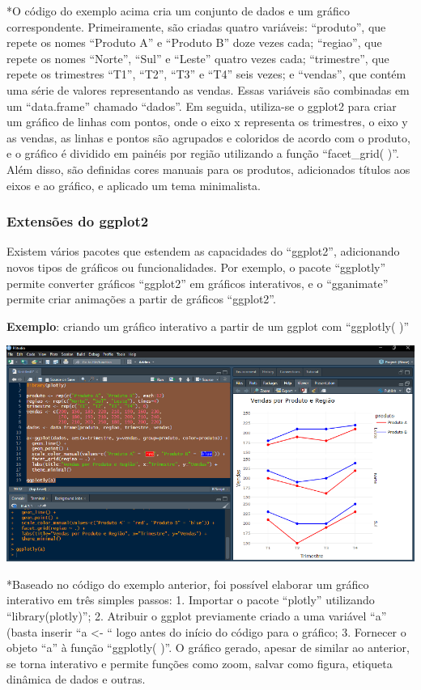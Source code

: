 \documentclass[
]{book}
\begin{document}
*O código do exemplo acima cria um conjunto de dados e um gráfico correspondente. Primeiramente, são criadas quatro variáveis: ``produto'', que repete os nomes ``Produto A'' e ``Produto B'' doze vezes cada; ``regiao'', que repete os nomes ``Norte'', ``Sul'' e ``Leste'' quatro vezes cada; ``trimestre'', que repete os trimestres ``T1'', ``T2'', ``T3'' e ``T4'' seis vezes; e ``vendas'', que contém uma série de valores representando as vendas. Essas variáveis são combinadas em um ``data.frame'' chamado ``dados''. Em seguida, utiliza-se o ggplot2 para criar um gráfico de linhas com pontos, onde o eixo x representa os trimestres, o eixo y as vendas, as linhas e pontos são agrupados e coloridos de acordo com o produto, e o gráfico é dividido em painéis por região utilizando a função ``facet\_grid( )''. Além disso, são definidas cores manuais para os produtos, adicionados títulos aos eixos e ao gráfico, e aplicado um tema minimalista.

\subsubsection{Extensões do ggplot2}\label{extensuxf5es-do-ggplot2}

Existem vários pacotes que estendem as capacidades do ``ggplot2'', adicionando novos tipos de gráficos ou funcionalidades. Por exemplo, o pacote ``ggplotly'' permite converter gráficos ``ggplot2'' em gráficos interativos, e o ``gganimate'' permite criar animações a partir de gráficos ``ggplot2''.

\textbf{Exemplo}: criando um gráfico interativo a partir de um ggplot com ``ggplotly( )''

\includegraphics{images/clipboard-465180566.png}

*Baseado no código do exemplo anterior, foi possível elaborar um gráfico interativo em três simples passos: 1. Importar o pacote ``plotly'' utilizando ``library(plotly)''; 2. Atribuir o ggplot previamente criado a uma variável ``a'' (basta inserir ``a \textless- `` logo antes do início do código para o gráfico; 3. Fornecer o objeto ``a'' à função ``ggplotly( )''. O gráfico gerado, apesar de similar ao anterior, se torna interativo e permite funções como zoom, salvar como figura, etiqueta dinâmica de dados e outras.
\end{document}

